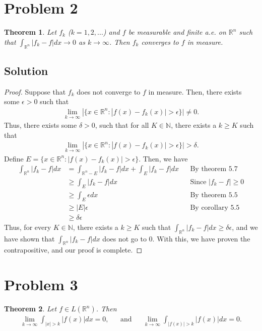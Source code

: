 \documentclass[10pt,a4paper]{article}
\theoremstyle{theorem}
\newtheorem{theorem}{Theorem}
\theoremstyle{definition}
\begin{document}
\section*{Problem 2}
\begin{theorem}
Let $f_k$ ($k = 1,2,...$) and $f$ be measurable and finite a.e. on $\mathbb{R}^n$ such that $\int_{\mathbb{R}^n} |f_k - f| dx \to 0$ as $k \to \infty$. Then $f_k$ converges to $f$ in measure.
\end{theorem}

\subsection*{Solution}
\begin{proof}
Suppose that $f_k$ does not converge to $f$ in measure. Then, there exists some $\epsilon > 0$ such that 
\begin{align*}
\lim_{k \to \infty} |\{x \in \mathbb{R}^n : |f(x) - f_k(x)| > \epsilon\}| \not= 0.
\end{align*}
Thus, there exists some $\delta > 0$, such that for all $K \in \mathbb{N}$, there exists a $k \geq K$ such that 
\begin{align*}
\lim_{k \to \infty} |\{x \in \mathbb{R}^n : |f(x) - f_k(x)| > \epsilon\}| > \delta.
\end{align*}
Define $E = \{x \in \mathbb{R}^n : |f(x) - f_k(x)| > \epsilon\}$. Then, we have
\begin{align*}
\int_{\mathbb{R}^n} |f_k - f| dx &= \int_{\mathbb{R}^n - E} |f_k - f| dx + \int_{E} |f_k - f| dx && \text{By theorem 5.7}\\
&\geq \int_{E} |f_k - f| dx &&\text{Since } |f_k - f| \geq 0\\
&\geq \int_{E} \epsilon dx && \text{By theorem 5.5}\\
&\geq |E| \epsilon &&\text{By corollary 5.5}\\
&\geq \delta \epsilon
\end{align*}
Thus, for every $K \in \mathbb{N}$, there exists a $k \geq K$ such that $\int_{\mathbb{R}^n} |f_k - f| dx \geq \delta \epsilon$, and we have shown that $\int_{\mathbb{R}^n} |f_k - f| dx$ does not go to $0$. With this, we have proven the contrapositive, and our proof is complete.
\end{proof}

\section*{Problem 3}
\begin{theorem}
Let $f \in L(\mathbb{R}^n)$. Then
\begin{align*}
\lim_{k \to \infty} \int_{|x| > k} |f(x)|dx = 0, &&\text{and} && \lim_{k \to \infty} \int_{|f(x)| > k} |f(x)|dx = 0.
\end{align*}
\end{theorem}
\end{document}
